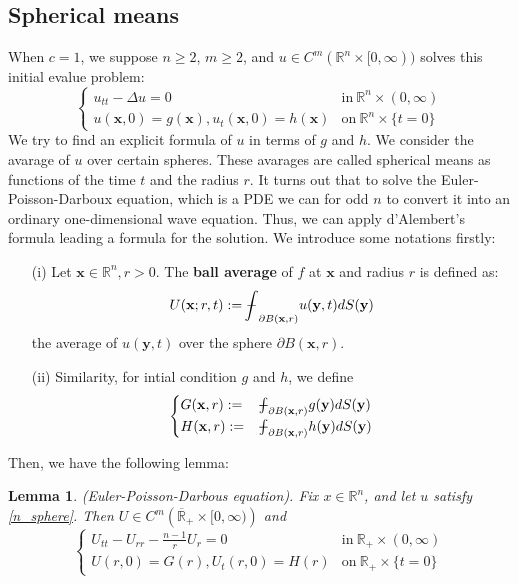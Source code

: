 \documentclass[10pt]{article}
\def\rr{{\mathbb R}}
\def\vc{{\mathbf x}}
\def\vcc{{\mathbf y}}
\newtheorem{lemma}{Lemma}[section]
\newcommand\tbbint{{-\mkern -16mu\int}}
\newcommand\dbbint{{-\mkern -19mu\int}}
\newcommand\bbint{
{\mathchoice{\dbbint}{\tbbint}{\tbbint}{\tbbint}}
}
\begin{document}
\subsection{Spherical means}
When $c=1$, we suppose $n \geq 2$, $m \geq 2$, and $u \in C^m(\rr^n \times [0,\infty))$ solves this initial evalue problem:
\begin{equation}
    \label{n_sphere}
    \begin{cases}
        u_{tt} - \Delta u = 0 & \text{in} \ \rr^n \times (0,\infty)\\
        u(\mathbf{x},0) = g(\mathbf{x}), u_t(\mathbf{x},0) = h(\mathbf{x}) & \text{on} \ \rr^n \times \{t=0\}
    \end{cases}
\end{equation}
We try to find an explicit formula of $u$ in terms of $g$ and $h$. We consider the avarage of $u$ over certain spheres. These avarages are called spherical means as functions of the time $t$ and the radius $r$. It turns out that to solve the Euler-Poisson-Darboux equation, which is a PDE we can for odd $n$ to convert it into an ordinary one-dimensional wave equation. Thus, we can apply d'Alembert's formula leading a formula for the solution. We introduce some notations firstly:
    \begin{itemize}
        \item [(i)] Let $\vc \in \rr^n, r>0$. The \textbf{ball average} of $f$ at $\vc$ and radius $r$ is defined as:
        \begin{equation}
            \label{ball_average}
         U(\vc;r, t) := \bbint_{\partial B(\vc,r)} u(\mathbf{y},t) d S(\mathbf{y})
        \end{equation}
        the average of $u(\vcc, t)$ over the sphere $\partial B(\vc, r)$.
        \item [(ii)] Similarity, for intial condition $g$ and $h$, we define
         \begin{equation*}
         \begin{cases}
             G(\vc, r): =& \bbint_{\partial B(\vc,r)} g(\mathbf{y}) d S(\mathbf{y})\\
             H(\vc, r): =& \bbint_{\partial B(\vc,r)} h(\mathbf{y}) d S(\mathbf{y})
         \end{cases}
     \end{equation*}
        \end{itemize}
Then, we have the following lemma:
\begin{lemma}(Euler-Poisson-Darbous equation). Fix $x\in \rr^n$, and let $u$  satisfy \ref{n_sphere}. Then $U \in C^{m}\left(\overline{\mathbb{R}}_{+} \times[0, \infty)\right)$ and 
    \begin{equation}
        \label{EPD}
        \begin{cases}
            U_{tt} - U_{rr} - \frac{n-1}{r}U_r = 0 & \text{in}\ \rr_{+} \times (0,\infty)\\
            U(r,0) = G(r), U_t(r,0) = H(r) & \text{on} \ \rr_{+} \times \{t=0\}
        \end{cases}
    \end{equation}
\end{lemma}
\end{document}
